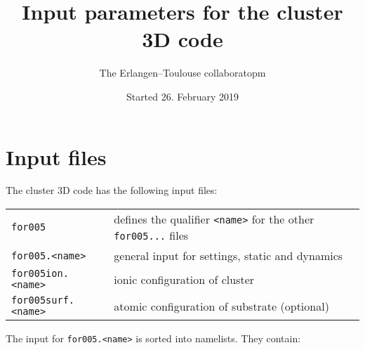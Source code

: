 \documentclass[12pt]{article}
\begin{document}
\title{Input parameters for the cluster 3D code}
\author{The Erlangen--Toulouse collaboratopm}
\date{Started 26. February 2019}
\maketitle

\tableofcontents
\newpage


\section{Input files}
\label{sec:inputs}

The cluster 3D code has the following input files:
\\[-28pt]
\begin{center}
\begin{tabular}{ll}
\hline
 {\tt for005} & defines the qualifier {\tt <name>} for 
                the other {\tt for005...} files\\
 {\tt for005.<name>} & general input for settings, static and
 dynamics\\
 {\tt for005ion.<name>} & ionic configuration of cluster\\
 {\tt for005surf.<name>} & atomic configuration of substrate (optional)\\
\hline
\end{tabular}
\end{center}
The input for {\tt for005.<name>} is sorted into namelists.
They contain:\\
\end{document}
